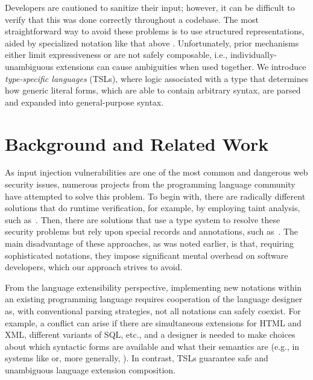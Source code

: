 \documentclass{sig-alternate}
\newcommand{\qs}[1]{}%
\begin{document}
Developers are cautioned to sanitize their input; however, it can be difficult to verify that this was done correctly throughout a codebase. The most straightforward way to avoid these problems is to use structured representations, aided by specialized notation like that above \cite{Bravenboer:2007:PIA:1289971.1289975}. Unfortunately, prior mechanisms either limit expressiveness or are not safely composable, i.e., individually-unambiguous extensions can cause ambiguities when used together. We introduce \emph{type-specific languages} (TSLs), where  logic associated with a type that determines how generic literal forms, which are able to contain arbitrary syntax, are parsed and expanded into general-purpose syntax. 

\section{Background and Related Work}
\qs{Describe the specialized (but pertinent) background necessary to appreciate the work. Include references to the literature where appropriate, and briefly explain where your work departs from that done by others.}

As input injection vulnerabilities are one of the most common and dangerous web security issues, numerous projects from the programming language community have attempted to solve this problem. To begin with, there are radically different solutions that do runtime verification, for example, by employing taint analysis, such as~\cite{fortify,wasp,PLAS12,scriptgard}. Then, there are solutions that use a type system to resolve these security problems but rely upon special records and annotations, such as~\cite{urOSDI,ur/Web,swift,swamy08fable}. The main disadvantage of these approaches, as was noted earlier, is that, requiring sophisticated notations, they impose significant mental overhead on software developers, which our approach strives to avoid.

From the language extensibility perspective, implementing new notations within an existing programming language requires cooperation of the language designer as, with conventional parsing strategies, not all notations can safely coexist. For example, a conflict can arise if there are simultaneous extensions for HTML and XML, different variants of SQL, etc., and a designer is needed to make choices about which syntactic forms are available and what their semantics are (e.g., in systems like \cite{Erdweg:2011:SLL:2048147.2048199} or, more generally, \cite{Erdweg:2013:FEL:2517208.2517210}). In contrast, TSLs guarantee safe and unambiguous language extension composition.
\end{document}

